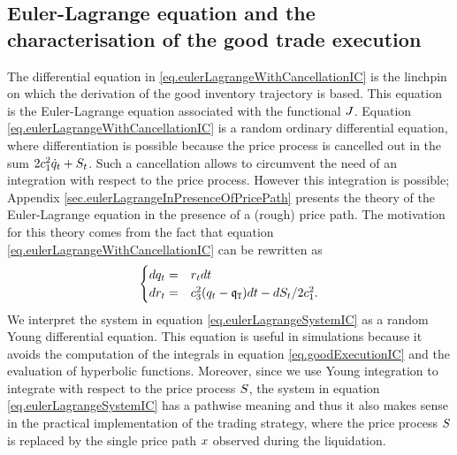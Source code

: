 \documentclass[10pt,a4paper]{article}
\begin{document}
\subsection{Euler-Lagrange equation and the characterisation of the good trade execution}\label{sec.eulerLagrangeIC}
The differential equation in \eqref{eq.eulerLagrangeWithCancellationIC} is the linchpin on which the derivation of the good inventory trajectory is based. This equation is the Euler-Lagrange equation associated with the functional $J$. Equation \eqref{eq.eulerLagrangeWithCancellationIC} is a random ordinary differential equation, where differentiation is possible because the price process is cancelled out in the sum $ 2c_{1}^{2} \dot{q}_{t} + S_t$. Such a cancellation allows to circumvent the need of an integration with respect to the price process. However this integration is possible; Appendix \ref{sec.eulerLagrangeInPresenceOfPricePath} presents the theory of the Euler-Lagrange equation in the presence of a (rough) price path. The motivation for this theory comes from the fact that equation \eqref{eq.eulerLagrangeWithCancellationIC} can be rewritten as 
\begin{equation}\label{eq.eulerLagrangeSystemIC}
\begin{cases}
dq_t=& r_t dt \\
dr_t=& c_{3}^{2} (q_t - \mathfrak{q}_{\mathtt{T} })dt - dS_t/2c_{1}^{2}.
\end{cases}
\end{equation}
We interpret the system in equation \eqref{eq.eulerLagrangeSystemIC} as a random Young differential equation. This equation  is useful in simulations because it avoids the computation of the integrals in equation \eqref{eq.goodExecutionIC} and the evaluation of hyperbolic functions. Moreover, since we use Young integration to integrate with respect to the price process $S$, the system in equation \eqref{eq.eulerLagrangeSystemIC} has a pathwise meaning and thus it also makes sense in the practical implementation of the trading strategy, where the price process $S$ is replaced by the single price path $x$ observed during the liquidation. 
\end{document}
